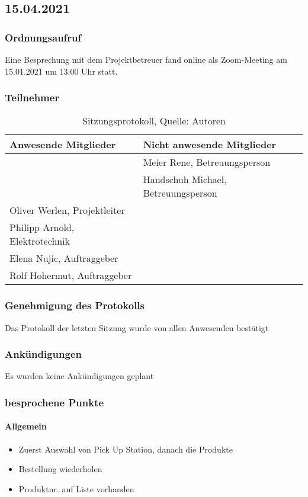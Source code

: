 \subsection{15.04.2021}
\subsubsection{Ordnungsaufruf}
Eine Besprechung mit dem Projektbetreuer fand online als Zoom-Meeting am 15.01.2021 um 13:00 Uhr statt.
\subsubsection{Teilnehmer}
\begin{table}[H]
	\setlength\extrarowheight{2pt} %
	\begin{tabularx}{\textwidth}{|X|X|}
		\hline
		\textbf{Anwesende Mitglieder} &  \textbf{Nicht anwesende Mitglieder} \\
		\hline
		& Meier Rene, Betreuungsperson   \\
		& Handschuh Michael, Betreuungsperson   \\
		Oliver Werlen, Projektleiter &  \\
		Philipp Arnold, Elektrotechnik  \\
		Elena Nujic, Auftraggeber &  \\
		Rolf Hohermut, Auftraggeber &  \\
		\hline
	\end{tabularx}
	\caption{ \label{tbl: Teilnehmerliste vom 15.04.2021_2}Sitzungsprotokoll, Quelle: Autoren}
\end{table}
\subsubsection{Genehmigung des Protokolls}
Das Protokoll der letzten Sitzung wurde von allen Anwesenden bestätigt
\subsubsection{Ankündigungen}
Es wurden keine Ankündigungen geplant
\subsubsection{besprochene Punkte}
\paragraph{Allgemein}
\begin{itemize}
	\item Zuerst Auswahl von Pick Up Station, danach die Produkte
	\item Bestellung wiederholen
	\item Produktnr. auf Liste vorhanden
\end{itemize}



